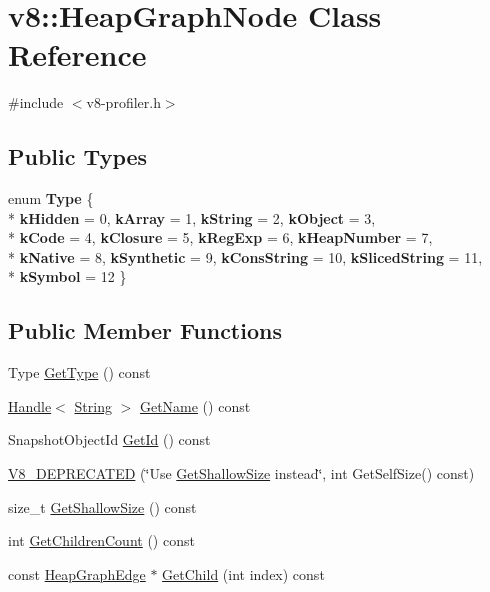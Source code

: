 \hypertarget{classv8_1_1HeapGraphNode}{}\section{v8\+:\+:Heap\+Graph\+Node Class Reference}
\label{classv8_1_1HeapGraphNode}


{\ttfamily \#include $<$v8-\/profiler.\+h$>$}

\subsection*{Public Types}
\begin{DoxyCompactItemize}
\item 
\hypertarget{classv8_1_1HeapGraphNode_ab674a58103a51abc56f99edc6a1479ed}{}enum {\bfseries Type} \{ \\*
{\bfseries k\+Hidden} = 0, 
{\bfseries k\+Array} = 1, 
{\bfseries k\+String} = 2, 
{\bfseries k\+Object} = 3, 
\\*
{\bfseries k\+Code} = 4, 
{\bfseries k\+Closure} = 5, 
{\bfseries k\+Reg\+Exp} = 6, 
{\bfseries k\+Heap\+Number} = 7, 
\\*
{\bfseries k\+Native} = 8, 
{\bfseries k\+Synthetic} = 9, 
{\bfseries k\+Cons\+String} = 10, 
{\bfseries k\+Sliced\+String} = 11, 
\\*
{\bfseries k\+Symbol} = 12
 \}\label{classv8_1_1HeapGraphNode_ab674a58103a51abc56f99edc6a1479ed}

\end{DoxyCompactItemize}
\subsection*{Public Member Functions}
\begin{DoxyCompactItemize}
\item 
Type \hyperlink{classv8_1_1HeapGraphNode_a5e07fc855bded52229e62b855fa08c5d}{Get\+Type} () const 
\item 
\hyperlink{classv8_1_1Handle}{Handle}$<$ \hyperlink{classv8_1_1String}{String} $>$ \hyperlink{classv8_1_1HeapGraphNode_af5f24ee6c07a57814e18bd317cb5576a}{Get\+Name} () const 
\item 
Snapshot\+Object\+Id \hyperlink{classv8_1_1HeapGraphNode_a0faf2a07888af9ca938b3ac089500b4c}{Get\+Id} () const 
\item 
\hyperlink{classv8_1_1HeapGraphNode_af0c5bd1eebaa351d90db71311168729a}{V8\+\_\+\+D\+E\+P\+R\+E\+C\+A\+T\+E\+D} (\char`\"{}Use \hyperlink{classv8_1_1HeapGraphNode_a5f6f1e87efce0b297c3ffad0b50f34d5}{Get\+Shallow\+Size} instead\char`\"{}, int Get\+Self\+Size() const)
\item 
size\+\_\+t \hyperlink{classv8_1_1HeapGraphNode_a5f6f1e87efce0b297c3ffad0b50f34d5}{Get\+Shallow\+Size} () const 
\item 
int \hyperlink{classv8_1_1HeapGraphNode_a0a49abe006755dd5536d15ae42f552d4}{Get\+Children\+Count} () const 
\item 
const \hyperlink{classv8_1_1HeapGraphEdge}{Heap\+Graph\+Edge} $\ast$ \hyperlink{classv8_1_1HeapGraphNode_ac3435611573e58b6614aeaab68442905}{Get\+Child} (int index) const 
\end{DoxyCompactItemize}


